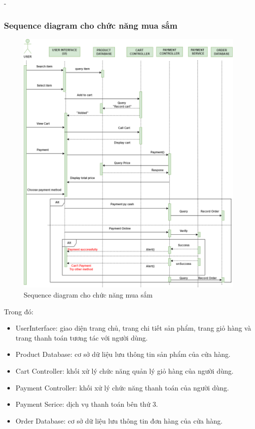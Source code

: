 \begin {list} {-}{}
\subsubsection{Sequence diagram cho chức năng mua sắm}
\begin{figure}[H]
    \centering
    \includegraphics[scale=0.5]{images/hieu/chap-3/shopping-sequence-diagram.png}
    \caption{Sequence diagram cho chức năng mua sắm}
\end{figure}
Trong đó:
\begin{itemize}
    \item UserInterface: giao diện trang chủ, trang chi tiết sản phẩm, trang giỏ hàng và trang thanh toán tương tác với người dùng.
    \item Product Database: cơ sở dữ liệu lưu thông tin sản phẩm của cửa hàng.
    \item Cart Controller: khối xử lý chức năng quản lý giỏ hàng của người dùng.
    \item Payment Controller: khối xử lý chức năng thanh toán của người dùng.
    \item Payment Serice: dịch vụ thanh toán bên thứ 3.
    \item Order Database: cơ sở dữ liệu lưu thông tin đơn hàng của cửa hàng.
\end{itemize}
\newpage

\end{list}
